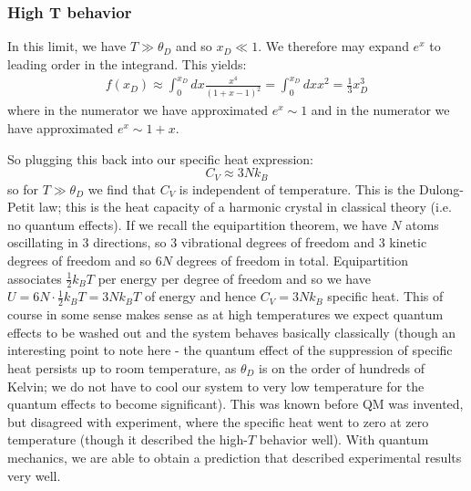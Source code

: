 \subsubsection{High T behavior}
In this limit, we have $T \gg \theta_D$ and so $x_D \ll 1$. We therefore may expand $e^x$ to leading order in the integrand. This yields:
\begin{align*}
    f(x_D) \approx \int_0^{x_D}dx \frac{x^4}{(1+x-1)^2} = \int_0^{x_D} dx x^2 = \frac{1}{3}x_D^3
\end{align*}
where in the numerator we have approximated $e^x \sim 1$ and in the numerator we have approximated $e^x \sim 1 + x$.

So plugging this back into our specific heat expression:
\begin{equation}
    C_V \approx 3Nk_B
\end{equation}
so for $T \gg \theta_D$ we find that $C_V$ is independent of temperature. This is the Dulong-Petit law; this is the heat capacity of a harmonic crystal in classical theory (i.e. no quantum effects). If we recall the equipartition theorem, we have $N$ atoms oscillating in $3$ directions, so $3$ vibrational degrees of freedom and $3$ kinetic degrees of freedom and so $6N$ degrees of freedom in total. Equipartition associates $\frac{1}{2}k_B T$ per energy per degree of freedom and so we have $U = 6N \cdot \frac{1}{2}k_B T = 3Nk_B T$ of energy and hence $C_V = 3Nk_B$ specific heat. This of course in some sense makes sense as at high temperatures we expect quantum effects to be washed out and the system behaves basically classically (though an interesting point to note here - the quantum effect of the suppression of specific heat persists up to room temperature, as $\theta_D$ is on the order of hundreds of Kelvin; we do not have to cool our system to very low temperature for the quantum effects to become significant). This was known before QM was invented, but disagreed with experiment, where the specific heat went to zero at zero temperature (though it described the high-$T$ behavior well). With quantum mechanics, we are able to obtain a prediction that described experimental results very well.

